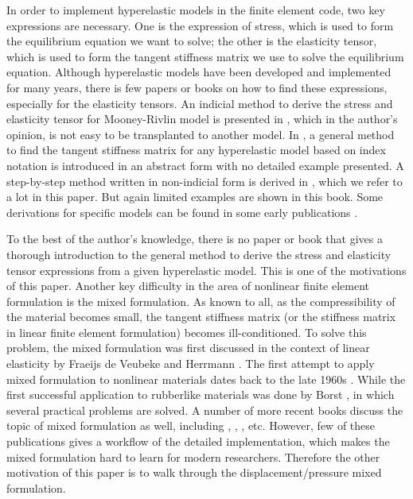 In order to implement hyperelastic models in the finite element code, two key expressions are necessary. One is the expression of stress, which is used to form the equilibrium equation we want to solve; the other is the elasticity tensor, which is used to form the tangent stiffness matrix we use to solve the equilibrium equation.  Although hyperelastic models have been developed and implemented for many years, there is few papers or books on how to find these expressions, especially for the elasticity tensors.  An indicial method to derive the stress and elasticity tensor for Mooney-Rivlin model is presented in \cite{Bower}, which in the author's opinion, is not easy to be transplanted to another model. In \cite{Belytschko}, a general method to find the tangent stiffness matrix for any hyperelastic model based on index notation is introduced in an abstract form with no detailed example presented. A step-by-step method written in non-indicial form is derived in \cite{Holzapfel}, which we refer to a lot in this paper. But again limited examples are shown in this book. Some derivations for specific models can be found in some early publications \cite{Weiss, Nicholson}.

To the best of the author's knowledge, there is no paper or book that gives a thorough introduction to the general method to derive the stress and elasticity tensor expressions from a given hyperelastic model. This is one of the motivations of this paper. Another key difficulty in the area of nonlinear finite element formulation is the mixed formulation. As known to all, as the compressibility of the material becomes small, the tangent stiffness matrix (or the stiffness matrix in linear finite element formulation) becomes ill-conditioned. To solve this problem, the mixed formulation was first discussed in the context of linear elasticity by Fraeijs de Veubeke \cite{Veubeke} and Herrmann \cite{Herrmann}. The first attempt to apply mixed formulation to nonlinear materials dates back to the late 1960s \cite{Oden}. While the first successful application to rubberlike materials was done by Borst \cite{Borst}, in which several practical problems are solved. A number of more recent books discuss the topic of mixed formulation as well, including \cite{Bathe}, \cite{Holzapfel}, \cite{Zienkiewicz}, etc. However, few of these publications gives a workflow of the detailed implementation, which makes the mixed formulation hard to learn for modern researchers. Therefore the other motivation of this paper is to walk through the displacement/pressure mixed formulation. 

